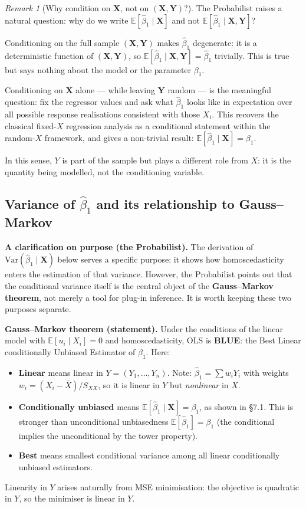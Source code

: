\documentclass[a4paper,oneside,12pt]{extarticle}
\theoremstyle{plain}
\theoremstyle{definition}
\theoremstyle{remark}
\newtheorem{remark}[proposition]{Remark}
\newcommand*{\E}{\mathbb{E}}
\newcommand*{\Var}{\mathrm{Var}}
\begin{document}
\begin{remark}[Why condition on $\mathbf{X}$, not on $(\mathbf{X},\mathbf{Y})$?]
The Probabilist raises a natural question: why do we write $\E[\hat\beta_1 \mid
\mathbf{X}]$ and not $\E[\hat\beta_1 \mid \mathbf{X}, \mathbf{Y}]$?

Conditioning on the full sample $(\mathbf{X}, \mathbf{Y})$ makes
$\hat\beta_1$ degenerate: it is a deterministic function of
$(\mathbf{X}, \mathbf{Y})$, so
$\E[\hat\beta_1 \mid \mathbf{X}, \mathbf{Y}] = \hat\beta_1$
trivially. This is true but says nothing about the model or
the parameter $\beta_1$.

Conditioning on $\mathbf{X}$ alone --- while leaving $\mathbf{Y}$
random --- is the meaningful question: fix the regressor values and
ask what $\hat\beta_1$ looks like in expectation over all possible
response realisations consistent with those $X_i$. This recovers
the classical fixed-$X$ regression analysis as a conditional
statement within the random-$X$ framework, and gives a non-trivial
result: $\E[\hat\beta_1 \mid \mathbf{X}] = \beta_1$.

In this sense, $Y$ is part of the sample but plays a different role
from $X$: it is the quantity being modelled, not the conditioning
variable.
\end{remark}

\subsection{Variance of $\hat\beta_1$ and its relationship to Gauss--Markov}

\textbf{A clarification on purpose (the Probabilist).}
The derivation of $\Var(\hat\beta_1 \mid \mathbf{X})$ below serves a
specific purpose: it shows how homoscedasticity enters the estimation
of that variance. However, the Probabilist points out that the conditional
variance itself is the central object of the \textbf{Gauss--Markov
theorem}, not merely a tool for plug-in inference. It is worth
keeping these two purposes separate.

\textbf{Gauss--Markov theorem (statement).}
Under the conditions of the linear model with $\E[u_i \mid X_i]=0$
and homoscedasticity, OLS is \textbf{BLUE}: the Best Linear
conditionally Unbiased Estimator of $\beta_1$. Here:
\begin{itemize}
  \item \textbf{Linear} means linear in $Y = (Y_1,\ldots,Y_n)$.
        Note: $\hat\beta_1 = \sum w_i Y_i$ with weights $w_i =
        (X_i-\bar X)/S_{XX}$, so it is linear in $Y$ but
        \emph{nonlinear} in $X$.
  \item \textbf{Conditionally unbiased} means $\E[\hat\beta_1 \mid
        \mathbf{X}] = \beta_1$, as shown in §7.1. This is stronger
        than unconditional unbiasedness $\E[\hat\beta_1]=\beta_1$
        (the conditional implies the unconditional by the tower
        property).
  \item \textbf{Best} means smallest conditional variance among all
        linear conditionally unbiased estimators.
\end{itemize}
Linearity in $Y$ arises naturally from MSE minimisation: the
objective is quadratic in $Y$, so the minimiser is linear in $Y$.
\end{document}
